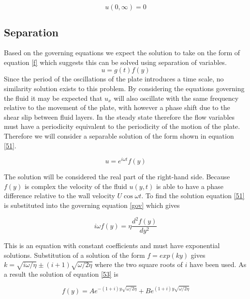 \documentclass[paper=a4, fontsize=12pt, abstract=on]{scrartcl}
\numberwithin{equation}{section}		%
\numberwithin{figure}{section}			%
\numberwithin{table}{section}				%
\begin{document}
 
  \begin{equation}
\label{b2}
u(0,\infty) = 0
\end{equation}

\subsection{Separation}
Based on the governing equations we expect the solution to take on the form of equation \ref{f} which suggests this can be solved using separation of variables.
\begin{equation}
\label{51}
u = g(t)f(y)
\end{equation}
Since the period of the oscillations of the plate introduces a time scale, no similarity solution exists to this problem. By considering the equations governing the fluid it may be expected that $u_x$ will also oscillate with the same frequency relative to the movement of the plate, with however a phase shift due to the shear slip between fluid layers. In the steady state therefore the flow variables must have a periodicity equivalent to the periodicity of the motion of the plate. Therefore we will consider a separable solution of the form shown in equation \ref{51}.

 \begin{equation}
\label{51}
u = e^{i\omega t}f(y)
\end{equation}


The solution will be considered the real part of the right-hand side. Because $f(y)$ is complex the velocity of the fluid $u(y,t)$ is able to have a phase difference relative to the wall velocity $U\cos \omega t$. To find the solution equation \ref{51} is substituted into the governing equation \ref{gov} which gives

\begin{equation}
\label{52}
i\omega f(y) = \eta \frac{d^2f(y)}{dy^2}
\end{equation}

This is an equation with constant coefficients and must have exponential solutions. Substitution of a solution of the form $f = exp(ky)$ gives $k = \sqrt{i\omega / \eta} \pm(i+1) \sqrt{\omega /2 \eta}$ where the two square roots of $i$ have been used. As a result the solution of equation \ref{53} is


\begin{equation}
\label{53}
f(y) = Ae^{-(1+i)y\sqrt{\omega/2\eta}}+Be^{(1+i)y\sqrt{\omega/2\eta}}
\end{equation}
\end{document}
